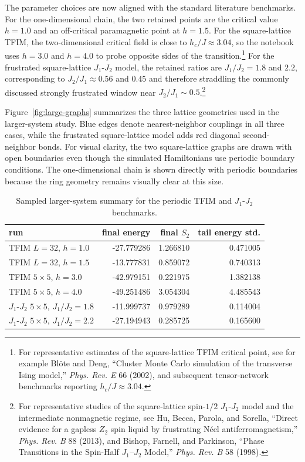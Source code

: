 \documentclass[11pt,a4paper]{article}
\begin{document}
The parameter choices are now aligned with the standard literature benchmarks. For the one-dimensional chain, the two retained points are the critical value $h=1.0$ and an off-critical paramagnetic point at $h=1.5$. For the square-lattice TFIM, the two-dimensional critical field is close to $h_c/J \approx 3.04$, so the notebook uses $h=3.0$ and $h=4.0$ to probe opposite sides of the transition.\footnote{For representative estimates of the square-lattice TFIM critical point, see for example Bl\"ote and Deng, ``Cluster Monte Carlo simulation of the transverse Ising model,'' \emph{Phys. Rev. E} 66 (2002), and subsequent tensor-network benchmarks reporting $h_c/J \approx 3.04$.} For the frustrated square-lattice $J_1$-$J_2$ model, the retained ratios are $J_1/J_2=1.8$ and $2.2$, corresponding to $J_2/J_1 \approx 0.56$ and $0.45$ and therefore straddling the commonly discussed strongly frustrated window near $J_2/J_1 \sim 0.5$.\footnote{For representative studies of the square-lattice spin-$1/2$ $J_1$-$J_2$ model and the intermediate nonmagnetic regime, see Hu, Becca, Parola, and Sorella, ``Direct evidence for a gapless $Z_2$ spin liquid by frustrating N\'eel antiferromagnetism,'' \emph{Phys. Rev. B} 88 (2013), and Bishop, Farnell, and Parkinson, ``Phase Transitions in the Spin-Half $J_1$--$J_2$ Model,'' \emph{Phys. Rev. B} 58 (1998).}

Figure~\ref{fig:large-graphs} summarizes the three lattice geometries used in the larger-system study. Blue edges denote nearest-neighbor couplings in all three cases, while the frustrated square-lattice model adds red diagonal second-neighbor bonds. For visual clarity, the two square-lattice graphs are drawn with open boundaries even though the simulated Hamiltonians use periodic boundary conditions. The one-dimensional chain is shown directly with periodic boundaries because the ring geometry remains visually clear at this size.

\begin{table}[H]
    \centering
    \begin{tabular}{lrrr}
        \toprule
        run & final energy & final $S_2$ & tail energy std. \\
        \midrule
        TFIM $L=32$, $h=1.0$ & -27.779286 & 1.266810 & 0.471005 \\
        TFIM $L=32$, $h=1.5$ & -13.777831 & 0.859072 & 0.740313 \\
        TFIM $5\times 5$, $h=3.0$ & -42.979151 & 0.221975 & 1.382138 \\
        TFIM $5\times 5$, $h=4.0$ & -49.251486 & 3.054304 & 4.485543 \\
        $J_1$-$J_2$ $5\times 5$, $J_1/J_2=1.8$ & -11.999737 & 0.979289 & 0.114004 \\
        $J_1$-$J_2$ $5\times 5$, $J_1/J_2=2.2$ & -27.194943 & 0.285725 & 0.165600 \\
        \bottomrule
    \end{tabular}
    \caption{Sampled larger-system summary for the periodic TFIM and $J_1$-$J_2$ benchmarks.}
    \label{tab:large-summary}
\end{table}
\end{document}

